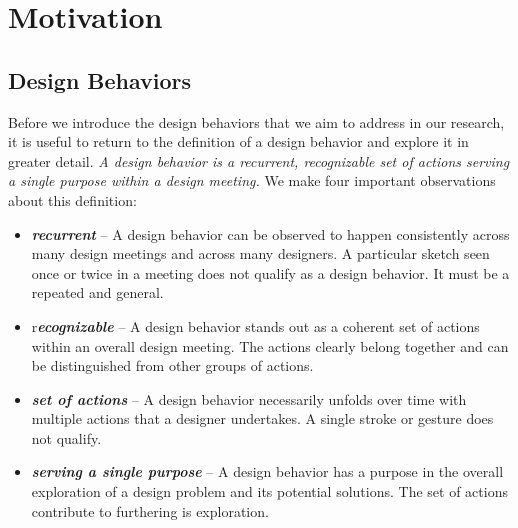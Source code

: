 \chapter{Motivation}

\section{Design Behaviors}

Before we introduce the design behaviors that we aim to address in our research, it is useful to return to the definition of a design behavior and explore it in greater detail. \emph{A design behavior is a recurrent, recognizable set of actions serving a single purpose within a design meeting.} We make four important observations about this definition:

\begin{itemize}
\item \textbf{\emph{recurrent}} -- A design behavior can be observed to happen consistently across many design meetings and across many designers. A particular sketch seen once or twice in a meeting does not qualify as a design behavior. It must be a repeated and general.
\item r\textbf{\emph{ecognizable}} -- A design behavior stands out as a coherent set of actions within an overall design meeting. The actions clearly belong together and can be distinguished from other groups of actions.
\item \textbf{\emph{set of actions}} -- A design behavior necessarily unfolds over time with multiple actions that a designer undertakes. A single stroke or gesture does not qualify. 
\item \textbf{\emph{serving a single purpose}} -- A design behavior has a purpose in the overall exploration of a design problem and its potential solutions. The set of actions contribute to furthering is exploration.  
\end{itemize}

